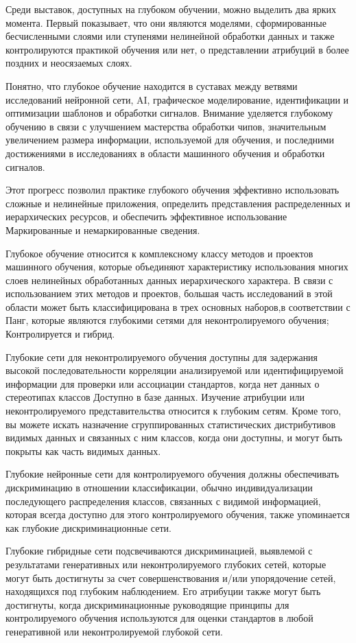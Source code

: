 Среди выставок, доступных на глубоком обучении, можно выделить два ярких момента. Первый показывает, что они являются моделями,
сформированные бесчисленными слоями или ступенями нелинейной обработки данных и также контролируются практикой обучения или нет,
о представлении атрибуций в более поздних и неосязаемых слоях.

Понятно, что глубокое обучение находится в суставах между ветвями исследований нейронной сети, AI,
графическое моделирование, идентификации и оптимизации шаблонов и обработки сигналов.
Внимание уделяется глубокому обучению в связи с улучшением мастерства обработки чипов,
значительным увеличением размера информации, используемой для обучения,
и последними достижениями в исследованиях в области машинного обучения и обработки сигналов.

Этот прогресс позволил практике глубокого обучения эффективно использовать сложные и нелинейные приложения,
определить представления распределенных и иерархических ресурсов,
и обеспечить эффективное использование Маркированные и немаркированные сведения.

Глубокое обучение относится к комплексному классу методов и проектов машинного обучения, которые объединяют характеристику 
использования многих слоев нелинейных обработанных данных иерархического характера. В связи с использованием этих методов и проектов,
большая часть исследований в этой области может быть классифицирована в трех основных наборов,в соответствии с Панг,
которые являются глубокими сетями для неконтролируемого обучения; Контролируется и гибрид.

Глубокие сети для неконтролируемого обучения доступны для задержания высокой последовательности корреляции анализируемой или идентифицируемой информации для проверки или ассоциации стандартов,
когда нет данных о стереотипах классов Доступно в базе данных.
Изучение атрибуции или неконтролируемого представительства относится к глубоким сетям. Кроме того,
вы можете искать назначение сгруппированных статистических дистрибутивов видимых данных и связанных с ним классов,
когда они доступны, и могут быть покрыты как часть видимых данных.

Глубокие нейронные сети для контролируемого обучения должны обеспечивать дискриминацию в отношении классификации,
обычно индивидуализации последующего распределения классов, связанных с видимой информацией,
которая всегда доступно для этого контролируемого обучения, также упоминается как глубокие дискриминационные сети.

Глубокие гибридные сети подсвечиваются дискриминацией, выявлемой с результатами генеративных или неконтролируемого глубоких сетей, которые могут быть достигнуты за счет
совершенствования и/или упорядочение сетей, находящихся под глубоким наблюдением. Его атрибуции также могут быть достигнуты,
когда дискриминационные руководящие принципы для контролируемого обучения используются для оценки стандартов в любой генеративной или неконтролируемой глубокой сети.

